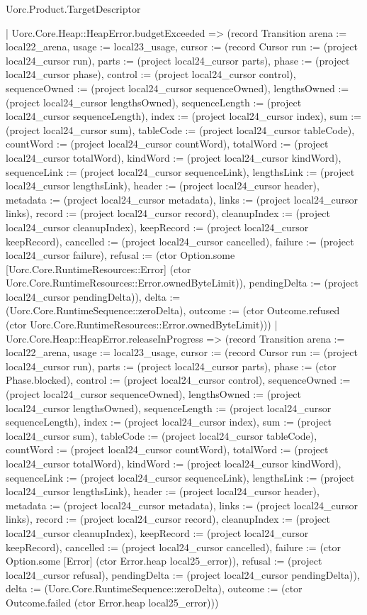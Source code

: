 \begin{lexlean}{Uorc.Product.TargetDescriptor}
\begin{semanticmodule}
{    | Uorc.Core.Heap::HeapError.budgetExceeded => (record Transition {arena := local22_arena, usage := local23_usage, cursor := (record Cursor {run := (project local24_cursor run), parts := (project local24_cursor parts), phase := (project local24_cursor phase), control := (project local24_cursor control), sequenceOwned := (project local24_cursor sequenceOwned), lengthsOwned := (project local24_cursor lengthsOwned), sequenceLength := (project local24_cursor sequenceLength), index := (project local24_cursor index), sum := (project local24_cursor sum), tableCode := (project local24_cursor tableCode), countWord := (project local24_cursor countWord), totalWord := (project local24_cursor totalWord), kindWord := (project local24_cursor kindWord), sequenceLink := (project local24_cursor sequenceLink), lengthsLink := (project local24_cursor lengthsLink), header := (project local24_cursor header), metadata := (project local24_cursor metadata), links := (project local24_cursor links), record := (project local24_cursor record), cleanupIndex := (project local24_cursor cleanupIndex), keepRecord := (project local24_cursor keepRecord), cancelled := (project local24_cursor cancelled), failure := (project local24_cursor failure), refusal := (ctor Option.some [Uorc.Core.RuntimeResources::Error] (ctor Uorc.Core.RuntimeResources::Error.ownedByteLimit)), pendingDelta := (project local24_cursor pendingDelta)}), delta := (Uorc.Core.RuntimeSequence::zeroDelta), outcome := (ctor Outcome.refused (ctor Uorc.Core.RuntimeResources::Error.ownedByteLimit))})
    | Uorc.Core.Heap::HeapError.releaseInProgress => (record Transition {arena := local22_arena, usage := local23_usage, cursor := (record Cursor {run := (project local24_cursor run), parts := (project local24_cursor parts), phase := (ctor Phase.blocked), control := (project local24_cursor control), sequenceOwned := (project local24_cursor sequenceOwned), lengthsOwned := (project local24_cursor lengthsOwned), sequenceLength := (project local24_cursor sequenceLength), index := (project local24_cursor index), sum := (project local24_cursor sum), tableCode := (project local24_cursor tableCode), countWord := (project local24_cursor countWord), totalWord := (project local24_cursor totalWord), kindWord := (project local24_cursor kindWord), sequenceLink := (project local24_cursor sequenceLink), lengthsLink := (project local24_cursor lengthsLink), header := (project local24_cursor header), metadata := (project local24_cursor metadata), links := (project local24_cursor links), record := (project local24_cursor record), cleanupIndex := (project local24_cursor cleanupIndex), keepRecord := (project local24_cursor keepRecord), cancelled := (project local24_cursor cancelled), failure := (ctor Option.some [Error] (ctor Error.heap local25_error)), refusal := (project local24_cursor refusal), pendingDelta := (project local24_cursor pendingDelta)}), delta := (Uorc.Core.RuntimeSequence::zeroDelta), outcome := (ctor Outcome.failed (ctor Error.heap local25_error))})
}
\end{semanticmodule}
\end{lexlean}
